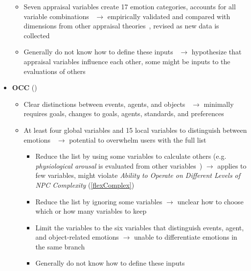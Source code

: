 \begin{itemize}
\begin{itemize}
        \item Seven appraisal variables create 17 emotion
        categories, accounts for all variable
        combinations~\citep[p.~68--69]{roseman2001model} $\rightarrow$
        empirically validated and compared with dimensions from other appraisal
        theories~\citep[p.~256, 260,267]{roseman1996appraisal}, revised as new
        data is collected~\citep[p.~72, 75]{roseman2001model}

        \item Generally do not know how to define these
        inputs~\citep[p.~86--87]{roseman2001model} $\rightarrow$ hypothesize
        that appraisal variables influence each other, some might be inputs to
        the evaluations of others~\citep[p.~271]{roseman1996appraisal}
    \end{itemize}

    \item \textbf{OCC} (\weak)
    \begin{itemize}
        \item Clear distinctions between events, agents, and
        objects~\citep[p.~58]{occ} $\rightarrow$ minimally requires goals,
        changes to goals, agents, standards, and preferences

        \item At least four global variables and 15 local variables to
        distinguish between emotions~\citep[p.~69]{occ} $\rightarrow$ potential
        to overwhelm users with the full list
        \begin{itemize}
            \item Reduce the list by using some variables to calculate others
            (e.g. \textit{physiological arousal} is evaluated from other
            variables~\citep[p.~65]{occ}) $\rightarrow$ applies to few
            variables, might violate \textit{Ability to Operate on Different
                Levels of NPC Complexity} (\ref{flexComplex})

            \item Reduce the list by ignoring some variables $\rightarrow$
            unclear how to choose which or how many variables to keep

            \item Limit the variables to the six variables that distinguish
            events, agent, and object-related emotions $\rightarrow$ unable to
            differentiate emotions in the same branch

            \item Generally do not know how to define these
            inputs~\citep[p.~86--87]{roseman2001model}
        \end{itemize}
    \end{itemize}


\end{itemize}
